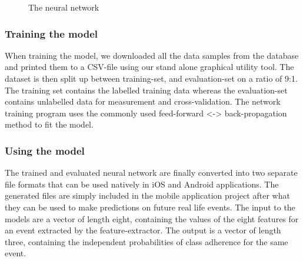 \documentclass[12pt, a4paper, onecolumn]{article}
\begin{document}
	\begin{figure}[H]
		\centering
		\caption{The neural network}%
		\label{fig:neural-network}%
	\end{figure}
	
	\subsubsection{Training the model}
	When training the model, we downloaded all the data samples from the database and printed them to a CSV-file using our stand alone graphical utility tool. The dataset is then split up between training-set, and evaluation-set on a ratio of 9:1. The training set contains the labelled training data whereas the evaluation-set contains unlabelled data for measurement and cross-validation. The network training program uses the commonly used feed-forward <-> back-propagation method \cite{neural_networks} to fit the model. 
	
	
	\subsubsection{Using the model}
	The trained and evaluated neural network are finally converted into two separate file formats that can be used natively in iOS and Android applications. The generated files are simply included in the mobile application project after what they can be used to make predictions on future real life events. The input to the models are a vector of length eight, containing the values of the eight features for an event extracted by the feature-extractor. The output is a vector of length three, containing the independent probabilities of class adherence for the same event. 
	
\end{document}
